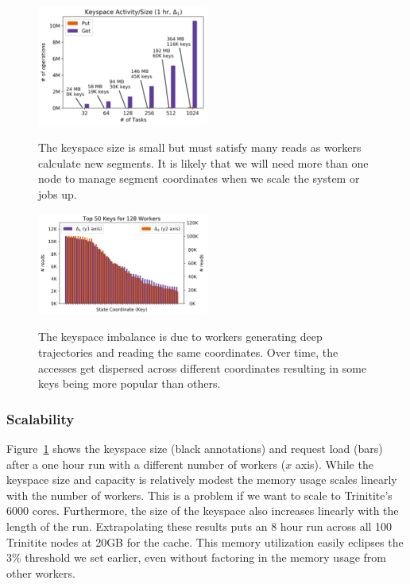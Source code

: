 \begin{figure}[t]
  \noindent\includegraphics[width=0.5\textwidth]{figures/methodology-keyspace.png}\\
  \caption{The keyspace size is small but must satisfy many reads as workers
  calculate new segments. It is likely that we will need
  more than one node to manage segment coordinates when we scale the system or jobs up.
  \label{fig:methodology-keyspace}}
\end{figure}

\begin{figure}[t]
  \noindent\includegraphics[width=0.5\textwidth]{figures/methodology-keys.png}\\
  \caption{The keyspace imbalance is due to workers generating deep
  trajectories and reading the same coordinates. Over time, the accesses get
  dispersed across different coordinates resulting in some keys being more
  popular than others.\label{fig:methodology-keys}}
\end{figure}

\subsubsection*{Scalability} Figure~\ref{fig:methodology-keyspace} shows the
keyspace size (black annotations) and request load (bars) after a one hour run
with a different number of workers (\(x\) axis). While the keyspace size and
capacity is relatively modest the memory usage scales linearly with the number
of workers. This is a problem if we want to scale to Trinitite's 6000 cores.
Furthermore, the size of the keyspace also increases linearly with the length
of the run.  Extrapolating these results puts an 8 hour run across all 100
Trinitite nodes at 20GB for the cache.  This memory utilization easily eclipses
the 3\% threshold we set earlier, even without factoring in the memory usage
from other workers.

